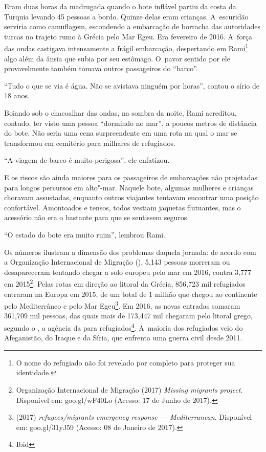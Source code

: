 

\putodd{}

\clearpage

 
% 
% 

Eram duas horas da madrugada quando o bote inflável partiu da costa da Turquia levando 45 pessoas a
bordo. Quinze delas eram crianças. A~escuridão serviria como camuflagem,
escondendo a embarcação de borracha das autoridades turcas no trajeto rumo à Grécia
pelo Mar Egeu. Era fevereiro de 2016. A~força das ondas castigava intensamente a frágil embarcação, despertando em Rami\footnote{ O nome do refugiado não foi revelado por completo
para proteger sua identidade.}  algo além da ânsia que subia por seu estômago. O~pavor sentido por ele provavelmente
também tomava outros passageiros  do ``barco''. 


``Tudo o que se via é água. Não se avistava ninguém por horas'', contou o
sírio de 18 anos.

Boiando sob o chacoalhar das ondas, na sombra da noite, Rami
acreditou, contudo, ter visto uma pessoa ``dormindo no mar'', a poucos
metros de distância do bote. Não seria uma cena surpreendente em uma
rota na qual o mar se transformou em cemitério para milhares de
refugiados.

``A viagem de barco é muito perigosa'', ele enfatizou.

E os riscos são ainda maiores para os passageiros de embarcações não
projetadas para longos percursos em alto"-mar. Naquele bote, algumas
mulheres e crianças choravam assustadas, enquanto outros viajantes
tentavam encontrar uma posição confortável. Amontoados e tensos, todos
vestiam jaquetas flutuantes, mas o acessório não era o bastante para que
se sentissem seguros.

``O estado do bote era muito ruim'', lembrou Rami.

Os números ilustram a dimensão dos problemas daquela jornada: de acordo
com a Organização Internacional de Migração (), 5,143 pessoas
morreram ou desapareceram tentando chegar a solo europeu pelo mar em
2016, contra 3,777 em 2015\footnote{ Organização Internacional de Migração (2017)
\emph{Missing migrants project}. Disponível em:
{goo.gl/wF40Lo}
(Acesso: 17 de Junho de 2017).}. Pelas rotas em direção ao
litoral da Grécia, 856,723 mil refugiados entraram na Europa em 2015, de
um total de 1 milhão que chegou ao continente pelo Mediterrâneo e pelo
Mar Egeu\footnote{  (2017) \emph{ refugees/migrants emergency
response --- Mediterranean}. Disponível em:
goo.gl/31yJ59
(Acesso: 08 de Janeiro
de 2017).}. Em 2016, as novas entradas somaram 361,709
mil pessoas, das quais mais de 173,447 mil chegaram pelo litoral grego,
segundo o , a agência da  para refugiados\footnote{ Ibid}. A~maioria dos refugiados veio do Afeganistão,  do Iraque e da Síria, que enfrenta
uma guerra civil desde 2011.

